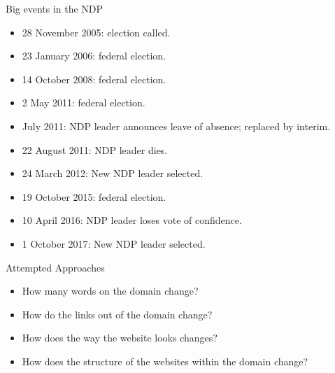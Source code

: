 \documentclass[10pt]{beamer}
\begin{document}
\begin{frame}{Big events in the NDP}

\begin{itemize}
\item 28 November 2005: election called.
\item 23 January 2006: federal election.
\item 14 October 2008: federal election.
\item 2 May 2011: federal election.
\item July 2011: NDP leader announces leave of absence; replaced by interim.
\item 22 August 2011: NDP leader dies.
\item 24 March 2012: New NDP leader selected.
\item 19 October 2015: federal election.
\item 10 April 2016: NDP leader loses vote of confidence.
\item 1 October 2017: New NDP leader selected.
\end{itemize}

\end{frame}

\begin{frame}{Attempted Approaches}
\Large
\begin{itemize}
\itemsep1.0em
\item How many words on the domain change?
\item How do the links out of the domain change?
\item How does the way the website looks changes?
\item How does the structure of the websites within the domain change?
\end{itemize}
\end{frame}
\end{document}

